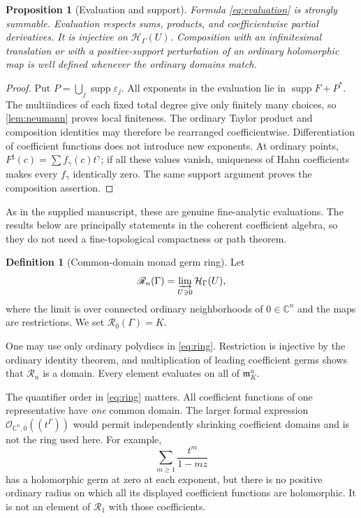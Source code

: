 \documentclass[11pt]{article}
\newtheorem{proposition}[theorem]{Proposition}
\theoremstyle{definition}
\newtheorem{definition}[theorem]{Definition}
\newcommand{\C}{\mathbb C}
\newcommand{\OO}{\mathcal O}
\newcommand{\HH}{\mathcal H}
\newcommand{\RR}{\mathscr R}
\newcommand{\mm}{\mathfrak m}
\newcommand{\supp}{\operatorname{supp}}
\newcommand{\sh}{^{\sharp}}
\newcommand{\eps}{\varepsilon}
\begin{document}
\begin{proposition}[Evaluation and support]\label{prop:evaluation}
Formula \eqref{eq:evaluation} is strongly summable. Evaluation respects sums, products, and coefficientwise partial derivatives. It is injective on $\HH_\Gamma(U)$. Composition with an infinitesimal translation or with a positive-support perturbation of an ordinary holomorphic map is well defined whenever the ordinary domains match.
\end{proposition}
\begin{proof}
Put $P=\bigcup_j\supp\eps_j$. All exponents in the evaluation lie in $\supp F+P^*$. The multiindices of each fixed total degree give only finitely many choices, so \cref{lem:neumann} proves local finiteness. The ordinary Taylor product and composition identities may therefore be rearranged coefficientwise. Differentiation of coefficient functions does not introduce new exponents. At ordinary points, $F\sh(c)=\sum f_\gamma(c)t^\gamma$; if all these values vanish, uniqueness of Hahn coefficients makes every $f_\gamma$ identically zero. The same support argument proves the composition assertion.
\end{proof}
As in the supplied manuscript, these are genuine fine-analytic evaluations. The results below are principally statements in the coherent coefficient algebra, so they do not need a fine-topological compactness or path theorem.

\begin{definition}[Common-domain monad germ ring]\label{def:ring}
Let
\begin{equation}\label{eq:ring}
 \RR_n(\Gamma)=\varinjlim_{U\ni0}\HH_\Gamma(U),
\end{equation}
where the limit is over connected ordinary neighborhoods of $0\in\C^n$ and the maps are restrictions. We set $\RR_0(\Gamma)=K$.
\end{definition}
One may use only ordinary polydiscs in \eqref{eq:ring}. Restriction is injective by the ordinary identity theorem, and multiplication of leading coefficient germs shows that $\RR_n$ is a domain. Every element evaluates on all of $\mm_K^n$.

The quantifier order in \eqref{eq:ring} matters. All coefficient functions of one representative have \emph{one} common domain. The larger formal expression $\OO_{\C^n,0}((t^\Gamma))$ would permit independently shrinking coefficient domains and is not the ring used here. For example,
\[
 \sum_{m\ge1}\frac{t^m}{1-mz}
\]
has a holomorphic germ at zero at each exponent, but there is no positive ordinary radius on which all its displayed coefficient functions are holomorphic. It is not an element of $\RR_1$ with those coefficients.
\end{document}
